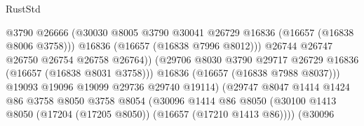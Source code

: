 \begin{lexlean}{RustStd}
\begin{coremodule}
                                              @3790
                                              @26666
                                              (@30030
                                                @8005
                                                @3790
                                                @30041
                                                @26729
                                                @16836
                                                (@16657 (@16838 @8006 @3758)))
                                              @16836
                                              (@16657 (@16838 @7996 @8012)))
                                            @26744
                                            @26747
                                            @26750
                                            @26754
                                            @26758
                                            @26764))
                                        (@29706
                                          @8030
                                          @3790
                                          @29717
                                          @26729
                                          @16836
                                          (@16657 (@16838 @8031 @3758)))
                                        @16836
                                        (@16657 (@16838 @7988 @8037)))
                                      @19093
                                      @19096
                                      @19099
                                      @29736
                                      @29740
                                      @19114)
                                    (@29747
                                      @8047
                                      @1414
                                      @1424
                                      @86
                                      @3758
                                      @8050
                                      @3758
                                      @8054
                                      (@30096
                                        @1414
                                        @86
                                        @8050
                                        (@30100
                                          @1413
                                          @8050
                                          (@17204 (@17205 @8050))
                                          (@16657 (@17210 @1413 @86))))
                                      (@30096

\end{coremodule}
\end{lexlean}
